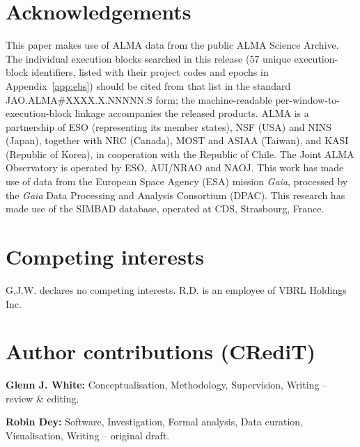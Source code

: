\documentclass{openjournal}
\begin{document}
\section*{Acknowledgements}
This paper makes use of ALMA data from the public ALMA Science Archive.
The individual execution blocks searched in this release (57 unique
execution-block identifiers, listed with their project codes and epochs
in Appendix~\ref{app:ebs}) should be cited from that list in the
standard JAO.ALMA\#XXXX.X.NNNNN.S form; the machine-readable
per-window-to-execution-block linkage accompanies the released products.
ALMA is a partnership of ESO
(representing its member states), NSF (USA) and NINS (Japan), together with NRC
(Canada), MOST and ASIAA (Taiwan), and KASI (Republic of Korea), in cooperation
with the Republic of Chile. The Joint ALMA Observatory is operated by ESO,
AUI/NRAO and NAOJ. This work has made use of data from the European Space
Agency (ESA) mission {\it Gaia}, processed by the {\it Gaia} Data Processing and
Analysis Consortium (DPAC). This research has made use of the SIMBAD
database, operated at CDS, Strasbourg, France.

\section*{Competing interests}
G.J.W. declares no competing interests. R.D. is an employee of VBRL
Holdings Inc. %

\section*{Author contributions (CRediT)}
\textbf{Glenn J. White:} Conceptualisation, Methodology, Supervision,
Writing -- review \& editing.

\textbf{Robin Dey:} Software, Investigation, Formal analysis, Data
curation, Visualisation, Writing -- original draft.
\end{document}
